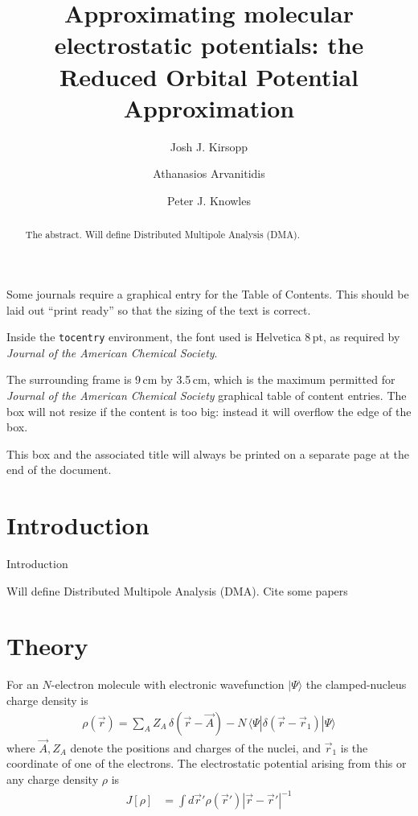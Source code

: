 \documentclass[journal=jacsat,manuscript=article]{achemso}
\author{Josh J. Kirsopp}
\author{Athanasios Arvanitidis}
\author{Peter J. Knowles}
\affiliation[Cardiff University]
{School of Chemistry, Cardiff University, Cardiff CF10 3AT, United Kingdom}
\title[Reduced Orbital Potential Approximation]
  {Approximating molecular electrostatic potentials: the Reduced Orbital Potential Approximation}
\begin{document}
\begin{tocentry}

Some journals require a graphical entry for the Table of Contents.
This should be laid out ``print ready'' so that the sizing of the
text is correct.

Inside the \texttt{tocentry} environment, the font used is Helvetica
8\,pt, as required by \emph{Journal of the American Chemical
Society}.

The surrounding frame is 9\,cm by 3.5\,cm, which is the maximum
permitted for  \emph{Journal of the American Chemical Society}
graphical table of content entries. The box will not resize if the
content is too big: instead it will overflow the edge of the box.

This box and the associated title will always be printed on a
separate page at the end of the document.

\end{tocentry}


\begin{abstract}
  The abstract.
  Will define
  Distributed Multipole Analysis (DMA).
\end{abstract}


\section{Introduction}
Introduction

  Will define
  Distributed Multipole Analysis (DMA)\cite{Stone1981,Stone1985DistributedAnalysis,Stone2005DistributedSets.}.
Cite some papers\cite{Knizia2015}

\section{Theory}

For an $N$-electron molecule with electronic wavefunction $|\Psi\rangle$ the clamped-nucleus charge density is
\begin{align}
    \rho(\vec r) = \sum_A Z_A \,\delta(\vec r - \vec A)
    -N \,\langle\Psi|\delta(\vec r-\vec r_1)|\Psi\rangle
\end{align}
where $\vec A, Z_A$ denote the positions and charges of the nuclei, and
$\vec r_1$ is the coordinate of one of the electrons.
The electrostatic potential arising from this or any charge density $\rho$ is
\begin{align}
    J[\rho] &= \int d\vec r' \rho(\vec r') |\vec r-\vec r'|^{-1}
\end{align}
\end{document}
